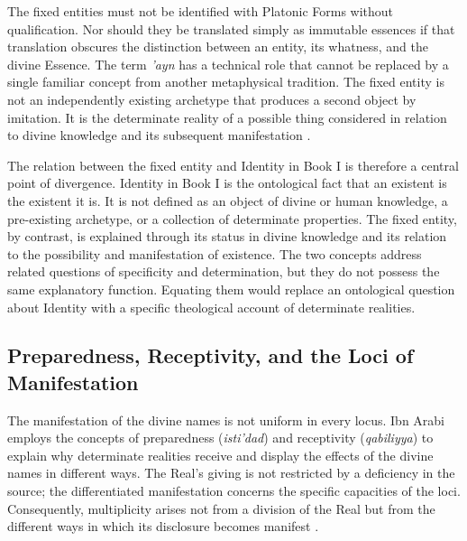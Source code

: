 \label{para:VS.B01.P01.C08.SS08.P003}

The fixed entities must not be identified with Platonic
Forms without qualification. Nor should they be
translated simply as immutable essences if that
translation obscures the distinction between an
entity, its whatness, and the divine Essence. The
term \textit{'ayn} has a technical role that cannot
be replaced by a single familiar concept from another
metaphysical tradition. The fixed entity is not an
independently existing archetype that produces a
second object by imitation. It is the determinate
reality of a possible thing considered in relation
to divine knowledge and its subsequent manifestation
\citep{ChittickIbnArabiSEP2025}.

\label{para:VS.B01.P01.C08.S16.SS08.P004}

The relation between the fixed entity and Identity
in Book I is therefore a central point of divergence.
Identity in Book I is the ontological fact that an
existent is the existent it is. It is not defined
as an object of divine or human knowledge, a
pre-existing archetype, or a collection of determinate
properties. The fixed entity, by contrast, is
explained through its status in divine knowledge
and its relation to the possibility and manifestation
of existence. The two concepts address related
questions of specificity and determination, but
they do not possess the same explanatory function.
Equating them would replace an ontological question
about Identity with a specific theological account
of determinate realities.



\subsection{Preparedness, Receptivity, and the Loci of Manifestation}
\label{subsec:ch08_s16_ss09}

\label{para:VS.B01.P01.C08.SS09.P001}

The manifestation of the divine names is not uniform
in every locus. Ibn Arabi employs the concepts of
preparedness (\textit{isti'dad}) and receptivity
(\textit{qabiliyya}) to explain why determinate
realities receive and display the effects of the
divine names in different ways. The Real's giving
is not restricted by a deficiency in the source;
the differentiated manifestation concerns the
specific capacities of the loci. Consequently,
multiplicity arises not from a division of the
Real but from the different ways in which its
disclosure becomes manifest \citep{ChittickSufiPathKnowledge1989}.

